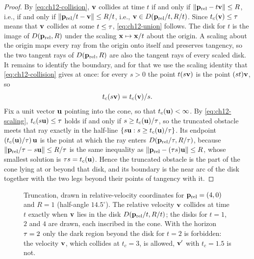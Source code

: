 \begin{proof}
By \cref{eq:ch12-collision}, $\mathbf{v}$ collides at time $t$ if and only if
$\left\lVert \mathbf{p}_{\mathrm{rel}} - t\mathbf{v} \right\rVert \le R$, i.e., if and only if
$\left\lVert \mathbf{p}_{\mathrm{rel}}/t - \mathbf{v} \right\rVert \le R/t$, i.e., $\mathbf{v} \in
D(\mathbf{p}_{\mathrm{rel}}/t,R/t)$. Since $t_c(\mathbf{v}) \le \tau$ means that
$\mathbf{v}$ collides at some $t \le \tau$, \cref{eq:ch12-union} follows. The disk for
$t$ is the image of $D(\mathbf{p}_{\mathrm{rel}},R)$ under the scaling
$\mathbf{x} \mapsto \mathbf{x}/t$ about the origin. A scaling about the origin maps
every ray from the origin onto itself and preserves tangency, so the two
tangent rays of $D(\mathbf{p}_{\mathrm{rel}},R)$ are also the tangent rays of
every scaled disk. It remains to identify the boundary, and for that we use
the scaling identity that \cref{eq:ch12-collision} gives at once: for every
$s > 0$ the point $t(s\mathbf{v})$ is the point $(st)\mathbf{v}$, so
\begin{equation}
  t_c(s\mathbf{v}) = t_c(\mathbf{v})/s .
  \label{eq:ch12-scaling}
\end{equation}
Fix a unit vector $\mathbf{u}$ pointing into the cone, so that
$t_c(\mathbf{u}) < \infty$. By \cref{eq:ch12-scaling},
$t_c(s\mathbf{u}) \le \tau$ holds if and only if $s \ge t_c(\mathbf{u})/\tau$, so
the truncated obstacle meets that ray exactly in the half-line
$\left\{ s\mathbf{u} : s \ge t_c(\mathbf{u})/\tau \right\}$. Its endpoint
$(t_c(\mathbf{u})/\tau)\,\mathbf{u}$ is the point at which the ray enters
$D(\mathbf{p}_{\mathrm{rel}}/\tau,R/\tau)$, because
$\left\lVert \mathbf{p}_{\mathrm{rel}}/\tau - s\mathbf{u} \right\rVert \le R/\tau$ is the same
inequality as $\left\lVert \mathbf{p}_{\mathrm{rel}} - (\tau s)\mathbf{u} \right\rVert \le R$, whose
smallest solution is $\tau s = t_c(\mathbf{u})$. Hence the truncated obstacle
is the part of the cone lying at or beyond that disk, and its boundary is the
near arc of the disk together with the two legs beyond their points of
tangency with it. \qedhere
\end{proof}

\begin{figure}[tb]
  \centering
  \caption{Truncation, drawn in relative-velocity coordinates for
  $\mathbf{p}_{\mathrm{rel}}=(4,0)$ and $R=1$ (half-angle $14.5^\circ$). The relative
  velocity $\mathbf{v}$ collides at time $t$ exactly when $\mathbf{v}$ lies in the disk
  $D(\mathbf{p}_{\mathrm{rel}}/t,R/t)$; the disks for $t=1$, $2$ and $4$ are
  drawn, each inscribed in the cone. With the horizon $\tau=2$ only the dark
  region beyond the disk for $t=2$ is forbidden: the velocity $\mathbf{v}$, which
  collides at $t_c=3$, is allowed, $\mathbf{v}'$ with $t_c=1.5$ is not.}
  \label{fig:ch12-truncated}
\end{figure}

